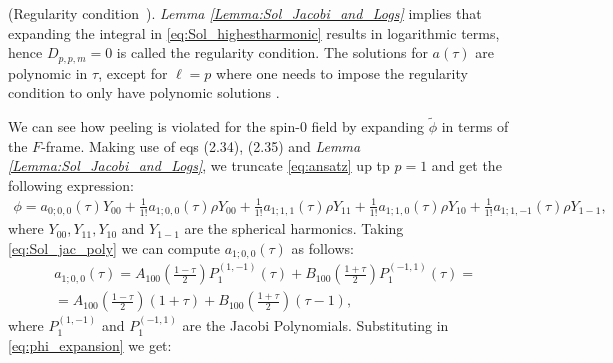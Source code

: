 \begin{remark}\label{Remark:logfreeRemark}(Regularity condition~\cite{MinMacKro22}).
  \emph{Lemma \ref{Lemma:Sol_Jacobi_and_Logs}} implies that expanding the integral in \eqref{eq:Sol_highestharmonic} results in logarithmic terms, hence $D_{p,p,m} = 0$ is called the regularity condition. The solutions for
  $a(\tau)$ are polynomic in $\tau$, except for $\ell = p$ where one needs to impose the regularity condition to only have polynomic solutions \cite{MinMacKro22}.
\end{remark}
We can see how peeling is violated for the spin-0 field by expanding $\tilde{\phi}$ in terms of the $F$-frame. Making use of eqs (2.34), (2.35) and \emph{Lemma \ref{Lemma:Sol_Jacobi_and_Logs}}, we truncate \eqref{eq:ansatz} up tp $p = 1$ and get the following expression:
\begin{align}\label{eq:phi_expansion}
  \phi = a_{0;0,0}(\tau) Y_{00}+\frac{1}{1!} a_{1;0,0}(\tau) \rho Y_{00}+\frac{1}{1!} a_{1;1,1}(\tau) \rho Y_{11}+\frac{1}{1!} a_{1;1,0}(\tau) \rho Y_{10} + \frac{1}{1!} a_{1;1,-1}(\tau) \rho Y_{1-1},
\end{align}
where $Y_{00}, Y_{11}, Y_{10}$ and $Y_{1-1}$ are the spherical harmonics. Taking \eqref{eq:Sol_jac_poly} we can compute $a_{1;0,0}(\tau)$ as follows:
\begin{align}\label{eq:a100}
  & a_{1 ; 0,0}(\tau) = A_{100}\left(\frac{1-\tau}{2}\right) P_{1}^{(1,-1)}(\tau)+B_{100}\left(\frac{1+\tau}{2}\right) P_{1}^{(-1,1)}(\tau) = \nonumber \\
  & = A_{100}\left(\frac{1-\tau}{2}\right)(1+\tau)+B_{100}\left(\frac{1+\tau}{2}\right)(\tau-1),
\end{align}
where $P_{1}^{(1,-1)}$ and $P_{1}^{(-1,1)}$ are the Jacobi Polynomials.
Substituting in \eqref{eq:phi_expansion} we get:
